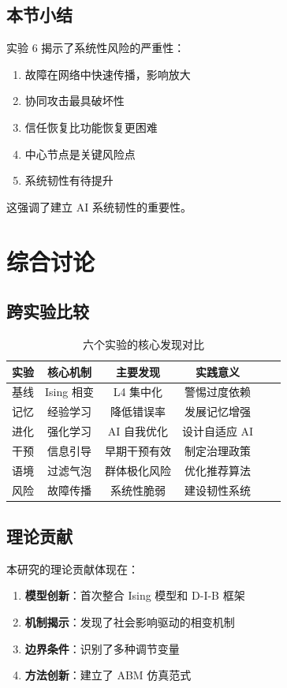 \documentclass[a4paper,12pt]{article}
\begin{document}
\subsection{本节小结}

实验 6 揭示了系统性风险的严重性：
\begin{enumerate}
    \item[$\checkmark$] 故障在网络中快速传播，影响放大
    \item[$\checkmark$] 协同攻击最具破坏性
    \item[$\checkmark$] 信任恢复比功能恢复更困难
    \item[$\star$] 中心节点是关键风险点
    \item[$\star$] 系统韧性有待提升
\end{enumerate}

这强调了建立 AI 系统韧性的重要性。

\section{综合讨论}

\subsection{跨实验比较}

\begin{table}[H]
\centering
\caption{六个实验的核心发现对比}
\begin{tabular}{lccccc}
\toprule
\textbf{实验} & \textbf{核心机制} & \textbf{主要发现} & \textbf{实践意义} \\
\midrule
基线 & Ising 相变 & L4 集中化 & 警惕过度依赖 \\
记忆 & 经验学习 & 降低错误率 & 发展记忆增强 \\
进化 & 强化学习 & AI 自我优化 & 设计自适应 AI \\
干预 & 信息引导 & 早期干预有效 & 制定治理政策 \\
语境 & 过滤气泡 & 群体极化风险 & 优化推荐算法 \\
风险 & 故障传播 & 系统性脆弱 & 建设韧性系统 \\
\bottomrule
\end{tabular}
\end{table}

\subsection{理论贡献}

本研究的理论贡献体现在：
\begin{enumerate}
    \item \textbf{模型创新}：首次整合 Ising 模型和 D-I-B 框架
    \item \textbf{机制揭示}：发现了社会影响驱动的相变机制
    \item \textbf{边界条件}：识别了多种调节变量
    \item \textbf{方法创新}：建立了 ABM 仿真范式
\end{enumerate}
\end{document}
